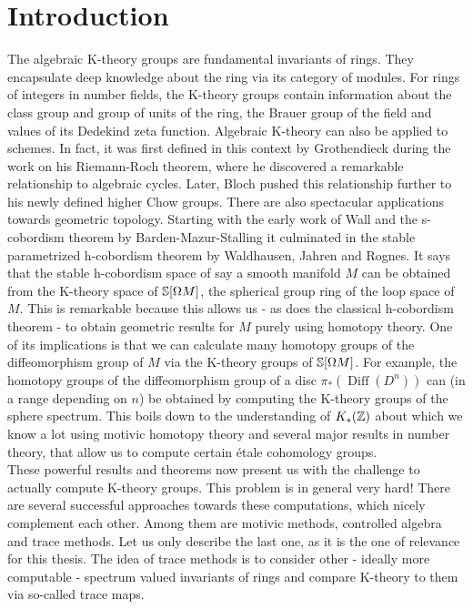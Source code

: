 \chapter{Introduction}

The algebraic K-theory groups are fundamental invariants of rings. 
They encapsulate deep knowledge about the ring via its category of modules.
For rings of integers in number fields, the K-theory groups contain information about the class group and group of units of the ring, the Brauer group of the field and values of its Dedekind zeta function.
Algebraic K-theory can also be applied to schemes. In fact, it was first defined in this context by Grothendieck during the work on his Riemann-Roch theorem, where he discovered a remarkable relationship to algebraic cycles.
Later, Bloch pushed this relationship further to his newly defined higher Chow groups.
There are also spectacular applications towards geometric topology.
Starting with the early work of Wall and the s-cobordism theorem by Barden-Mazur-Stalling it culminated in the stable parametrized h-cobordism theorem by Waldhausen, Jahren and Rognes. It says that the stable h-cobordism space of say a smooth manifold $M$ can be obtained from the K-theory space of $\S[\Omega M]$, the spherical group ring of the loop space of $M$.
This is remarkable because this allows us - as does the classical h-cobordism theorem - to obtain geometric results for $M$ purely using homotopy theory.
One of its implications is that we can calculate many homotopy groups of the diffeomorphism group of $M$ via the K-theory groups of $\S[\Omega M]$.
For example, the homotopy groups of the diffeomorphism group of a disc $\pi_* (\operatorname{Diff}(D^n))$ can (in a range depending on $n$) be obtained by computing the K-theory groups of the sphere spectrum. This boils down to the understanding of $K_*(\Z)$ about which we know a lot using motivic homotopy theory and several major results in number theory, that allow us to compute certain étale cohomology groups.
\\
These powerful results and theorems now present us with the challenge to actually compute K-theory groups. 
This problem is in general very hard! 
There are several successful approaches towards these computations, which nicely complement each other. Among them are motivic methods, controlled algebra and trace methods. 
Let us only describe the last one, as it is the one of relevance for this thesis.
The idea of trace methods is to consider other - ideally more computable - spectrum valued invariants of rings and compare K-theory to them via so-called trace maps. 
